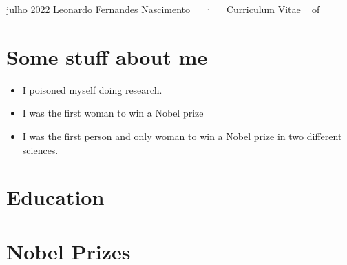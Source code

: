 \documentclass[11pt,a4paper,]{awesome-cv}
\providecommand{\tightlist}{%
	\setlength{\itemsep}{0pt}\setlength{\parskip}{0pt}}
\begin{document}
\makecvheader

\makecvfooter
  {julho 2022}
    {Leonardo Fernandes Nascimento~~~·~~~Curriculum Vitae}
  {\thepage~ of \pageref{LastPage}~}





\hypertarget{some-stuff-about-me}{%
\section{Some stuff about me}\label{some-stuff-about-me}}

\begin{itemize}
\tightlist
\item
  I poisoned myself doing research.
\item
  I was the first woman to win a Nobel prize
\item
  I was the first person and only woman to win a Nobel prize in two
  different sciences.
\end{itemize}

\hypertarget{education}{%
\section{Education}\label{education}}

\begin{cventries}
    \vspace{-4.0mm}
    \vspace{-4.0mm}
    \vspace{-4.0mm}
\end{cventries}

\hypertarget{nobel-prizes}{%
\section{Nobel Prizes}\label{nobel-prizes}}
\end{document}
